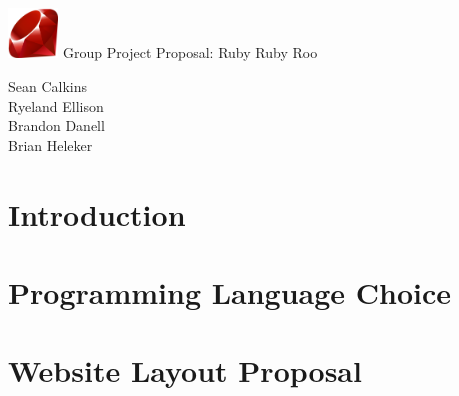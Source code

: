 \documentclass{article}
\begin{document}
\begin{titlepage}
  \centering %
  \vspace*{\fill} %
  
  \includegraphics[width=0.1\textwidth]{./ruby.png}
  \Huge Group Project Proposal: Ruby Ruby Roo

  \Large Sean Calkins \\
  \Large Ryeland Ellison \\
  \Large Brandon Danell \\
  \Large Brian Heleker

  \date{}
  
  \vspace*{\fill} %
\end{titlepage}




\section{Introduction}
 \cite{yamauchi-nakano-funakoshi:2013:SIGDIAL}

\section{Programming Language Choice}

\section{Website Layout Proposal}
\end{document}
